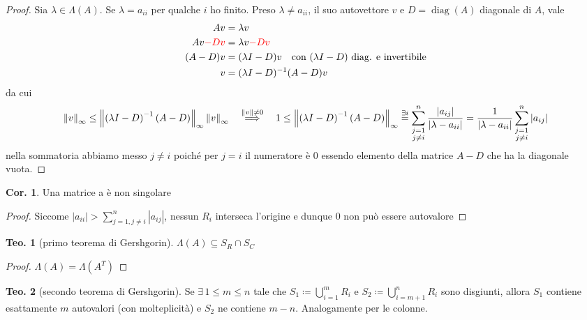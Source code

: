 \documentclass[a4paper,10pt]{article}
\theoremstyle{definition}
\DeclareMathOperator*{\diag}{diag}
\theoremstyle{indentdefinition}
\theoremstyle{indenttheorem}
\newtheorem{thm}{Teo.}
\newtheorem{cor}{Cor.}
\theoremstyle{myremark}
\theoremstyle{indentgeneral}
\theoremstyle{plain}
\theoremstyle{plain}
\begin{document}
\begin{proof} Sia $\lambda\in \Lambda(A)$. Se $\lambda=a_{ii}$ per qualche $i$ ho finito. Preso $\lambda\neq a_{ii}$, il suo autovettore $v$ e $D=\diag\left(A\right)$
diagonale di $A$, vale 
\begin{align*}
    Av&=\lambda v\\
    Av\textcolor{red}{-Dv}&=\lambda v\textcolor{red}{-Dv}\\
    (A-D)v&=(\lambda I-D) v  \quad \text{con $(\lambda I-D)$ diag. e invertibile} \\
    v&=(\lambda I-D)^{-1}(A-D) v
\end{align*}
da cui
\[
\left\Vert v\right\Vert _{\infty}\leq\left\Vert \left(\lambda I-D\right)^{-1}\left(A-D\right)\right\Vert_{\infty}\left\Vert v\right\Vert _{\infty}\quad \overset{\norm{v}\ne 0}{\implies} \quad1\leq\left\Vert \left(\lambda I-D\right)^{-1}\left(A-D\right)\right\Vert _{\infty}\overset{\exists i}{=}\sum_{\substack{j=1\\
j\neq i
}
}^{n}\frac{\left|a_{ij}\right|}{\left|\lambda-a_{ii}\right|}=\frac{1}{{\left|\lambda-a_{ii}\right|}}\sum_{\substack{j=1\\
j\neq i
}
}^{n}{\left|a_{ij}\right|}
\]
nella sommatoria abbiamo messo $j\ne i$ poiché per $j=i$ il numeratore è 0 essendo elemento della matrice $A-D$ che ha la diagonale vuota.
\end{proof}
\begin{cor}
Una matrice a  è non singolare
\end{cor}

\begin{proof}
Siccome $\left|a_{ii}\right|>\sum_{j=1,j\neq i}^{n}\left|a_{ij}\right|$,
nessun $R_{i}$ interseca l'origine e dunque $0$ non può essere autovalore
\end{proof}
\begin{thm}[primo teorema di Gershgorin]
\textup{$\Lambda\left(A\right)\subseteq S_{R}\cap S_{C}$}
\end{thm}
\begin{proof}
    $\Lambda(A)=\Lambda(A^T)$
\end{proof}

\begin{thm}[secondo teorema di Gershgorin]
\textup{Se $\exists\,1\leq m\leq n$ tale che $S_{1}\coloneqq\bigcup_{i=1}^{m}R_{i}$
e $S_{2}\coloneqq\bigcup_{i=m+1}^{n}R_{i}$ sono disgiunti, allora
$S_{1}$ contiene esattamente $m$ autovalori (con molteplicità) e
$S_{2}$ ne contiene $m-n$. }Analogamente per le colonne.
\end{thm}
\end{document}
